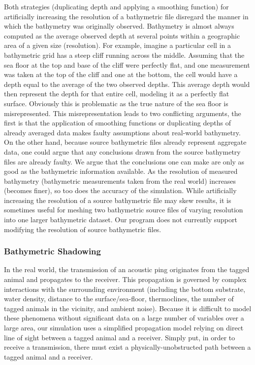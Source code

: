 Both strategies (duplicating depth and applying a smoothing function) for artificially increasing the resolution of a bathymetric file disregard the manner in which the bathymetry was originally observed.  Bathymetry is almost always computed as the average observed depth at several points within a geographic area of a given size (resolution).  For example, imagine a particular cell in a bathymetric grid has a steep cliff running across the middle.  Assuming that the sea floor at the top and base of the cliff were perfectly flat, and one measurement was taken at the top of the cliff and one at the bottom, the cell would have a depth equal to the average of the two observed depths.  This average depth would then represent the depth for that entire cell, modeling it as a perfectly flat surface.  Obviously this is problematic as the true nature of the sea floor is misrepresented.  This misrepresentation leads to two conflicting arguments, the first is that the application of smoothing functions or duplicating depths of already averaged data makes faulty assumptions about real-world bathymetry.  On the other hand, because source bathymetric files already represent aggregate data, one could argue that any conclusions drawn from the source bathymetry files are already faulty.  We argue that the conclusions one can make are only as good as the bathymetric information available.  As the resolution of measured bathymetry (bathymetric measurements taken from the real world) increases (becomes finer), so too does the accuracy of the simulation.  While artificially increasing the resolution of a source bathymetric file may skew results, it is sometimes useful for meshing two bathymetric source files of varying resolution into one larger bathymetric dataset.  Our program does not currently support modifying the resolution of source bathymetric files.


\subsubsection{Bathymetric Shadowing}
\label{bathymetricShadowing}
In the real world, the transmission of an acoustic ping originates from the tagged animal and propagates to the receiver.  This propagation is governed by complex interactions with the surrounding environment (including the bottom substrate, water density, distance to the surface/sea-floor, thermoclines, the number of tagged animals in the vicinity, and ambient noise).  Because it is difficult to model these phenomena without significant data on a large number of variables over a large area, our simulation uses a simplified propagation model relying on direct line of sight between a tagged animal and a receiver.  Simply put, in order to receive a transmission, there must exist a physically-unobstructed path between a tagged animal and a receiver.  




